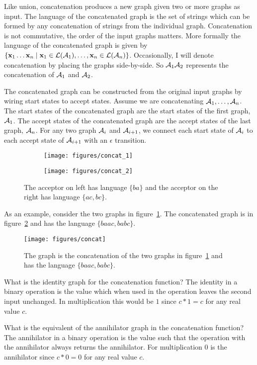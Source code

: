 \documentclass[main.tex]{subfiles}
\begin{document}
Like union, concatenation produces a new graph given two or more graphs as
input. The language of the concatenated graph is the set of strings which can
be formed by any concatenation of strings from the individual graph.
Concatenation is not commutative, the order of the input graphs matters. More
formally the language of the concatenated graph is given by $\{{\bf x}_1 \ldots
{\bf x}_n \mid {\bf x}_1 \in \mathcal{L}(\mathcal{A}_1), \ldots, {\bf x}_n \in \mathcal{L}(\mathcal{A}_n)\}$. Occasionally, I
will denote concatenation by placing the graphs side-by-side. So $\mathcal{A}_1 \mathcal{A}_2$
represents the concatenation of $\mathcal{A}_1$ and $\mathcal{A}_2$.

The concatenated graph can be constructed from the original input graphs by
wiring start states to accept states. Assume we are concatenating $\mathcal{A}_1,
\ldots, \mathcal{A}_n$. The start states of the concatenated graph are the start
states of the first graph, $\mathcal{A}_1$. The accept states of the concatenated
graph are the accept states of the last graph, $\mathcal{A}_n$. For any two graph
$\mathcal{A}_i$ and $\mathcal{A}_{i+1}$, we connect each start state of $\mathcal{A}_i$ to each accept
state of $\mathcal{A}_{i+1}$ with an $\epsilon$ transition.

\begin{figure}
    \centering
    \begin{subfigure}[b]{0.48\textwidth}
        \centering
        \texttt{[image: figures/concat\_1]}
    \end{subfigure}
    \begin{subfigure}[b]{0.48\textwidth}
        \centering
        \texttt{[image: figures/concat\_2]}
    \end{subfigure}
    \caption{The acceptor on left has language $\{ba\}$ and the acceptor on the
    right has language $\{ac, bc\}$.}
    \label{fig:concat_inputs}
\end{figure}

As an example, consider the two graphs in figure~\ref{fig:concat_inputs}. The
concatenated graph is in figure~\ref{fig:concat} and has the language $\{baac,
babc\}$.

\begin{figure}
    \centering
    \texttt{[image: figures/concat]}
    \caption{The graph is the concatenation of the two graphs in
    figure~\ref{fig:concat_inputs} and has the language $\{baac, babc\}$.}
    \label{fig:concat}
\end{figure}

\begin{example}
What is the identity graph for the concatenation function? The identity in a
binary operation is the value which when used in the operation leaves the second
input unchanged. In multiplication this would be $1$ since $c * 1 = c$ for any
real value $c$.

What is the equivalent of the annihilator graph in the concatenation function?
The annihilator in a binary operation is the value such that the operation with
the annihilator always returns the annihilator. For multiplication $0$ is the
annihilator since $c *0 = 0$ for any real value $c$.
\end{example}
\end{document}
